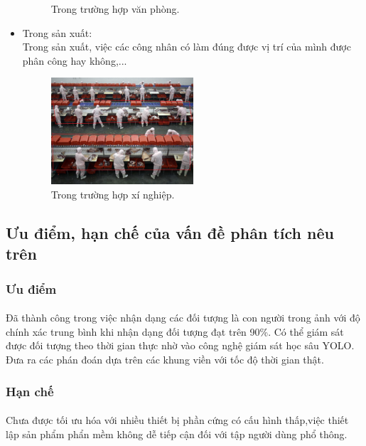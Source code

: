 \begin{flushleft}
\begin{itemize}
\begin{figure}[htbp]
            \caption{Trong trường hợp văn phòng.}
            \label{fig:img_2_VP}
        \end{figure}
        \item Trong sản xuất:\\
        Trong sản xuất, việc các công nhân có làm đúng được vị trí của mình được phân công hay không,...
        \begin{figure}[htbp]
            \centering
            \includegraphics[width=0.5\textwidth]{images/TH3.jpg}
            \caption{Trong trường hợp xí nghiệp.}
            \label{fig:img_3_XN}
        \end{figure}
        \pagebreak
    \end{itemize}
    

    
    \subsection{Ưu điểm, hạn chế của vấn đề phân tích nêu trên}
    \subsubsection{Ưu điểm}
    \fontsize{14}{13}\selectfont\paragraph{}
    Đã thành công trong việc nhận dạng các đối tượng là con người trong ảnh với độ chính xác trung bình khi nhận dạng đối tượng đạt trên 90\%. Có thể giám sát được đối tượng theo thời gian thực nhờ vào công nghệ giám sát học sâu YOLO. Đưa ra các phán đoán dựa trên các khung viền với tốc độ thời gian thật.
    \subsubsection{Hạn chế}
    \fontsize{14}{13}\selectfont\paragraph{}
    Chưa được tối ưu hóa với nhiều thiết bị phần cứng có cấu hình thấp,việc thiết lập sản phẩm phẩn mềm không dễ tiếp cận đối với tập người dùng phổ thông.

\end{flushleft}

